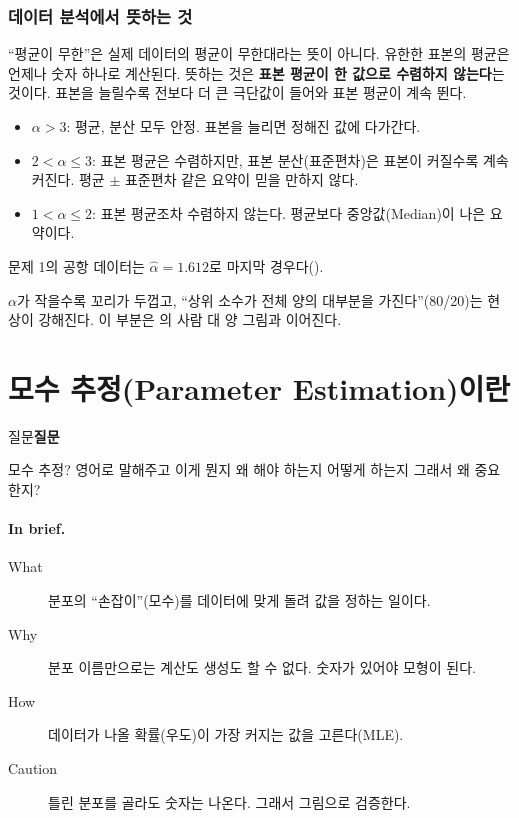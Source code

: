 \documentclass[11pt]{article}
\newenvironment{callout}[1][]
  {\par\medskip\noindent
   \begin{lrbox}{\calloutbox}\begin{minipage}{0.92\linewidth}
   \def\calloutttl{#1}\ifx\calloutttl\empty\else\textbf{#1}\par\smallskip\fi}
  {\end{minipage}\end{lrbox}%
   \fcolorbox{black!30}{black!3}{\usebox{\calloutbox}}\par\medskip}
\newcommand{\term}[1]{\textbf{#1}}
\begin{document}
\subsubsection{데이터 분석에서 뜻하는 것}
``평균이 무한''은 실제 데이터의 평균이 무한대라는 뜻이 아니다. 유한한 표본의
평균은 언제나 숫자 하나로 계산된다. 뜻하는 것은 \term{표본 평균이 한 값으로
수렴하지 않는다}는 것이다. 표본을 늘릴수록 전보다 더 큰 극단값이 들어와
표본 평균이 계속 뛴다.
\begin{itemize}
  \item $\alpha > 3$: 평균, 분산 모두 안정. 표본을 늘리면 정해진 값에 다가간다.
  \item $2 < \alpha \le 3$: 표본 평균은 수렴하지만, 표본 분산(표준편차)은 표본이
        커질수록 계속 커진다. 평균 $\pm$ 표준편차 같은 요약이 믿을 만하지 않다.
  \item $1 < \alpha \le 2$: 표본 평균조차 수렴하지 않는다. 평균보다 중앙값(Median)이
        나은 요약이다.
\end{itemize}
문제 1의 공항 데이터는 $\hat\alpha = 1.612$로 마지막 경우다().

$\alpha$가 작을수록 꼬리가 두껍고, ``상위 소수가 전체 양의 대부분을 가진다''(80/20)는
현상이 강해진다. 이 부분은 의 사람 대 양 그림과 이어진다.

\section{모수 추정(Parameter Estimation)이란}
\label{sec:param-est}

\begin{callout}[질문]
모수 추정? 영어로 말해주고 이게 뭔지 왜 해야 하는지 어떻게 하는지 그래서 왜 중요한지?
\end{callout}

\paragraph{In brief.}
\begin{description}
  \item[What] 분포의 ``손잡이''(모수)를 데이터에 맞게 돌려 값을 정하는 일이다.
  \item[Why] 분포 이름만으로는 계산도 생성도 할 수 없다. 숫자가 있어야 모형이 된다.
  \item[How] 데이터가 나올 확률(우도)이 가장 커지는 값을 고른다(MLE).
  \item[Caution] 틀린 분포를 골라도 숫자는 나온다. 그래서 그림으로 검증한다.
\end{description}
\end{document}
